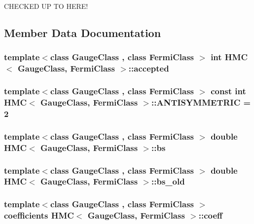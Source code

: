 CHECKED UP TO HERE! 

\subsection{Member Data Documentation}
\hypertarget{class_h_m_c_a11cb072cbdfddf4f6f6055bc77ae6b3a}{
\subsubsection[{accepted}]{\setlength{\rightskip}{0pt plus 5cm}template$<$class GaugeClass , class FermiClass $>$ int {\bf HMC}$<$ GaugeClass, FermiClass $>$::{\bf accepted}}}
\label{class_h_m_c_a11cb072cbdfddf4f6f6055bc77ae6b3a}
\hypertarget{class_h_m_c_a2be12d54de2a0c63f56f8a7168780f5d}{
\subsubsection[{ANTISYMMETRIC}]{\setlength{\rightskip}{0pt plus 5cm}template$<$class GaugeClass , class FermiClass $>$ const int {\bf HMC}$<$ GaugeClass, FermiClass $>$::{\bf ANTISYMMETRIC} = 2}}
\label{class_h_m_c_a2be12d54de2a0c63f56f8a7168780f5d}
\hypertarget{class_h_m_c_a940413017301b1520e4c6108a527c7c9}{
\subsubsection[{bs}]{\setlength{\rightskip}{0pt plus 5cm}template$<$class GaugeClass , class FermiClass $>$ double {\bf HMC}$<$ GaugeClass, FermiClass $>$::{\bf bs}}}
\label{class_h_m_c_a940413017301b1520e4c6108a527c7c9}
\hypertarget{class_h_m_c_a4146b7b06fcf3410b9bfda1c88c5fe39}{
\subsubsection[{bs\_\-old}]{\setlength{\rightskip}{0pt plus 5cm}template$<$class GaugeClass , class FermiClass $>$ double {\bf HMC}$<$ GaugeClass, FermiClass $>$::{\bf bs\_\-old}}}
\label{class_h_m_c_a4146b7b06fcf3410b9bfda1c88c5fe39}
\hypertarget{class_h_m_c_aa7a373acc998a08fcdc2e86dc6084b7b}{
\subsubsection[{coeff}]{\setlength{\rightskip}{0pt plus 5cm}template$<$class GaugeClass , class FermiClass $>$ {\bf coefficients} {\bf HMC}$<$ GaugeClass, FermiClass $>$::{\bf coeff}}}
